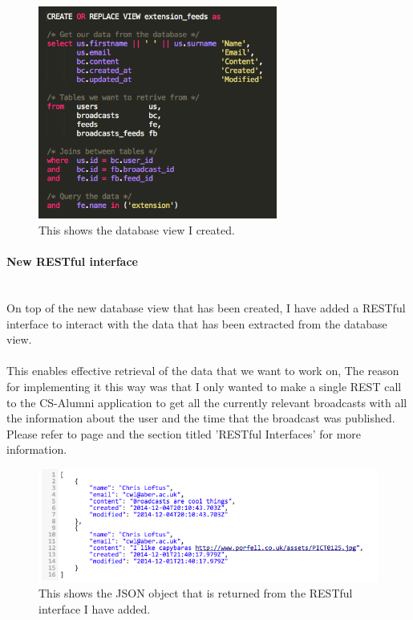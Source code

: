 \documentclass{article}
\newcommand{\myparagraph}[1]{\paragraph{#1}\mbox{}\\}
\begin{document}
\begin{figure}[H]
\centering
\includegraphics[width=0.7\textwidth]{sqlview}
\caption{This shows the database view I created.}
\end{figure}

\myparagraph{New RESTful interface}
On top of the new database view that has been created, I have added a RESTful interface to interact with the data that has been extracted from the database view. \\
\\
This enables effective retrieval of the data that we want to work on, The reason for implementing it this way was that I only wanted to make a single REST call to the CS-Alumni application to get all the currently relevant broadcasts with all the information about the user and the time that the broadcast was published.
\\ 
Please refer to page \pageref{sec:technology} and the section titled 'RESTful Interfaces' for more information.

\begin{figure}[H]
\centering
\includegraphics[width=\textwidth]{broadcastrest}
\caption{This shows the JSON object that is returned from the RESTful interface I have added.}
\end{figure}
\end{document}

